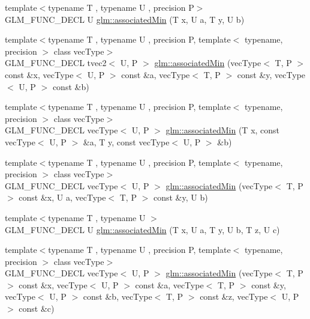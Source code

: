 \begin{DoxyCompactItemize}
\item 
{\footnotesize template$<$typename T , typename U , precision P$>$ }\\G\+L\+M\+\_\+\+F\+U\+N\+C\+\_\+\+D\+E\+C\+L U \hyperlink{group__gtx__associated__min__max_gacc01bd272359572fc28437ae214a02df}{glm\+::associated\+Min} (T x, U a, T y, U b)
\item 
{\footnotesize template$<$typename T , typename U , precision P, template$<$ typename, precision $>$ class vec\+Type$>$ }\\G\+L\+M\+\_\+\+F\+U\+N\+C\+\_\+\+D\+E\+C\+L tvec2$<$ U, P $>$ \hyperlink{group__gtx__associated__min__max_ga8b538d10872626668a078e2bd495af25}{glm\+::associated\+Min} (vec\+Type$<$ T, P $>$ const \&x, vec\+Type$<$ U, P $>$ const \&a, vec\+Type$<$ T, P $>$ const \&y, vec\+Type$<$ U, P $>$ const \&b)
\item 
{\footnotesize template$<$typename T , typename U , precision P, template$<$ typename, precision $>$ class vec\+Type$>$ }\\G\+L\+M\+\_\+\+F\+U\+N\+C\+\_\+\+D\+E\+C\+L vec\+Type$<$ U, P $>$ \hyperlink{group__gtx__associated__min__max_ga1dccff48fa5650c746533de83467da6e}{glm\+::associated\+Min} (T x, const vec\+Type$<$ U, P $>$ \&a, T y, const vec\+Type$<$ U, P $>$ \&b)
\item 
{\footnotesize template$<$typename T , typename U , precision P, template$<$ typename, precision $>$ class vec\+Type$>$ }\\G\+L\+M\+\_\+\+F\+U\+N\+C\+\_\+\+D\+E\+C\+L vec\+Type$<$ U, P $>$ \hyperlink{group__gtx__associated__min__max_ga076717f4e07c6ae725cc1382d1ac4869}{glm\+::associated\+Min} (vec\+Type$<$ T, P $>$ const \&x, U a, vec\+Type$<$ T, P $>$ const \&y, U b)
\item 
{\footnotesize template$<$typename T , typename U $>$ }\\G\+L\+M\+\_\+\+F\+U\+N\+C\+\_\+\+D\+E\+C\+L U \hyperlink{group__gtx__associated__min__max_gad0aa8f86259a26d839d34a3577a923fc}{glm\+::associated\+Min} (T x, U a, T y, U b, T z, U c)
\item 
{\footnotesize template$<$typename T , typename U , precision P, template$<$ typename, precision $>$ class vec\+Type$>$ }\\G\+L\+M\+\_\+\+F\+U\+N\+C\+\_\+\+D\+E\+C\+L vec\+Type$<$ U, P $>$ \hyperlink{group__gtx__associated__min__max_ga5bc6b9acbf9e060d58a342fbe3b73d43}{glm\+::associated\+Min} (vec\+Type$<$ T, P $>$ const \&x, vec\+Type$<$ U, P $>$ const \&a, vec\+Type$<$ T, P $>$ const \&y, vec\+Type$<$ U, P $>$ const \&b, vec\+Type$<$ T, P $>$ const \&z, vec\+Type$<$ U, P $>$ const \&c)

\end{DoxyCompactItemize}
